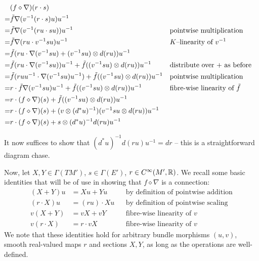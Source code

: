 \documentclass[./Thick_TQFTs_and_Quantum_Information.tex]{subfiles}
\begin{document}
\begin{align*}
   & (f \diamond \nabla)(r \cdot s) \\
  =& \tilde{f}\nabla(v^{-1}(r \cdot s)u)u^{-1} \\
  =& \tilde{f}\nabla(v^{-1}(ru \cdot su))u^{-1}
    && \text{pointwise multiplication} \\
  =& \tilde{f}\nabla(ru \cdot v^{-1}su)u^{-1}
    && \text{$K$--linearity of } v^{-1} \\
  =& \tilde{f}(ru \cdot \nabla(v^{-1}su) + (v^{-1}su) \otimes d(ru))u^{-1} \\
  =& \tilde{f}(ru \cdot \nabla(v^{-1}su))u^{-1}
      + \tilde{f}((v^{-1}su) \otimes d(ru))u^{-1}
    && \text{distribute over $+$ as before} \\
  =& \tilde{f}(ruu^{-1} \cdot \nabla(v^{-1}su)u^{-1})
      + \tilde{f}((v^{-1}su) \otimes d(ru))u^{-1}
    && \text{pointwise multiplication} \\
  =& r \cdot \tilde{f}\nabla(v^{-1}su)u^{-1}
      + \tilde{f}((v^{-1}su) \otimes d(ru))u^{-1}
    && \text{fibre-wise linearity of } \tilde{f} \\
  =& r \cdot (f \diamond \nabla)(s)
      + \tilde{f}((v^{-1}su) \otimes d(ru))u^{-1} \\
  =& r \cdot (f \diamond \nabla)(s)
      + (v \otimes (d^*u)^{-1})(v^{-1}su \otimes d(ru))u^{-1} \\
  =& r \cdot (f \diamond \nabla)(s)
      + s \otimes (d^*u)^{-1}d(ru)u^{-1}
\end{align*}

It now suffices to show that $(d^*u)^{-1}d(ru)u^{-1} = dr$ -- this is a
straightforward diagram chase. 


Now, let $X, Y \in \Gamma(TM')$, $s \in \Gamma(E')$, $r \in C^{\infty}(M', \mathbb{R})$.
We recall some basic identities that will be of use in showing that
$f \diamond \nabla$ is a connection:
\begin{align*}
(X + Y)u &= Xu + Yu && \text{by definition of pointwise addition} \\
(r \cdot X)u &= (ru) \cdot Xu && \text{by definition of pointwise scaling} \\
v(X + Y) &= vX + vY && \text{fibre-wise linearity of $v$} \\
v(r \cdot X) &= r \cdot vX && \text{fibre-wise linearity of $v$}
\end{align*}
We note that these identities hold for arbitrary bundle morphisms $(u, v)$,
smooth real-valued maps $r$ and sections $X, Y$, as long as the operations are
well-defined.
\end{document}
